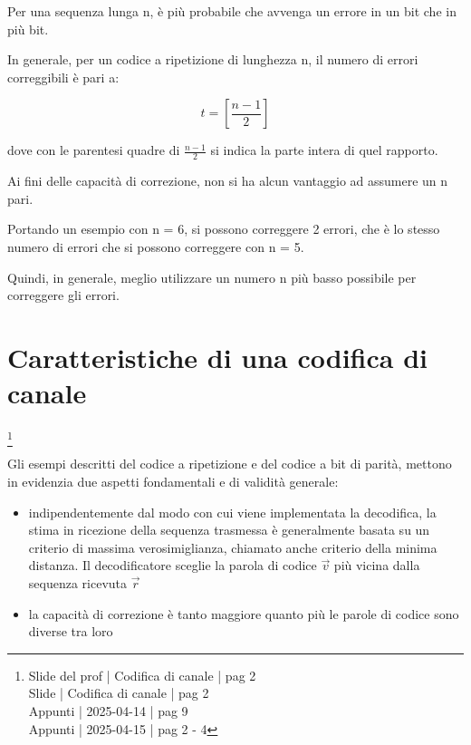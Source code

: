 Per una sequenza lunga n, è più probabile che avvenga un errore in un bit che in più bit. \newline 

In generale, per un codice a ripetizione di lunghezza n, il numero di errori correggibili è pari a: 

{
    \Large 
    \begin{equation}
        t = \left[ \frac{n - 1}{2} \right]
    \end{equation}
}

dove con le parentesi quadre di $\frac{n - 1}{2}$ si indica la parte intera di quel rapporto. \newline 

Ai fini delle capacità di correzione, non si ha alcun vantaggio ad assumere un n pari. \newline 

Portando un esempio con n = 6, si possono correggere 2 errori, 
che è lo stesso numero di errori che si possono correggere con n = 5. \newline 

Quindi, in generale, meglio utilizzare un numero n più basso possibile per correggere gli errori. \newline 

\newpage 

\section{Caratteristiche di una codifica di canale}
\footnote{Slide del prof | Codifica di canale | pag 2 \\
Slide | Codifica di canale | pag  2\\ 
Appunti | 2025-04-14 | pag 9 \\
Appunti | 2025-04-15 | pag 2 - 4
} 

Gli esempi descritti del codice a ripetizione e del codice a bit di parità, 
mettono in evidenzia due aspetti fondamentali e di validità generale: 

\begin{itemize}
    \item indipendentemente dal modo con cui viene implementata la decodifica, la stima in ricezione della sequenza trasmessa è generalmente basata su un criterio di massima verosimiglianza, chiamato anche criterio della minima distanza. \newline 
     Il decodificatore sceglie la parola di codice $\overrightarrow{v}$ più vicina dalla sequenza ricevuta $\overrightarrow{r}$ 
     \item la capacità di correzione è tanto maggiore quanto più le parole di codice sono diverse tra loro
\end{itemize}

